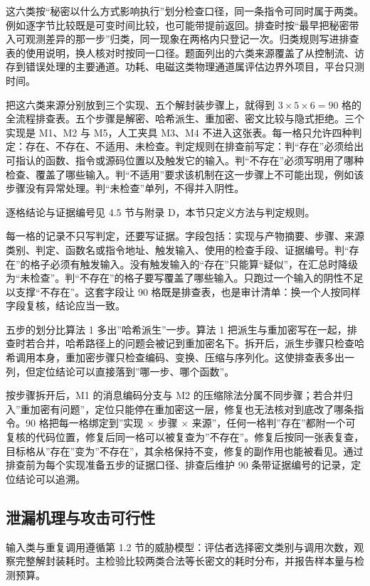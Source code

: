 这六类按“秘密以什么方式影响执行”划分检查口径，同一条指令可同时属于两类。例如逐字节比较既是可变时间比较，也可能带提前返回。排查时按“最早把秘密带入可观测差异的那一步”归类，同一现象在两格内只登记一次。归类规则写进排查表的使用说明，换人核对时按同一口径。题面列出的六类来源覆盖了从控制流、访存到错误处理的主要通道。功耗、电磁这类物理通道属评估边界外项目，平台只测时间。

把这六类来源分别放到三个实现、五个解封装步骤上，就得到 $3\times5\times6=90$ 格的全流程排查表。五个步骤是解密、哈希派生、重加密、密文比较与隐式拒绝。三个实现是 M1、M2 与 M5，人工夹具 M3、M4 不进入这张表。每一格只允许四种判定：存在、不存在、不适用、未检查。判定规则在排查前写定：判“存在”必须给出可指认的函数、指令或源码位置以及触发它的输入。判“不存在”必须写明用了哪种检查、覆盖了哪些输入。判“不适用”要求该机制在这一步骤上不可能出现，例如该步骤没有异常处理。判“未检查”单列，不得并入阴性。

逐格结论与证据编号见 4.5 节与附录 D，本节只定义方法与判定规则。

每一格的记录不只写判定，还要写证据。字段包括：实现与产物摘要、步骤、来源类别、判定、函数名或指令地址、触发输入、使用的检查手段、证据编号。判“存在”的格子必须有触发输入。没有触发输入的“存在”只能算“疑似”，在汇总时降级为“未检查”。判“不存在”的格子要写覆盖了哪些输入。只跑过一个输入的阴性不足以支撑“不存在”。这套字段让 90 格既是排查表，也是审计清单：换一个人按同样字段复核，结论应当一致。

五步的划分比算法 1 多出”哈希派生”一步。算法 1 把派生与重加密写在一起，排查时若合并，哈希路径上的问题会被记到重加密名下。拆开后，派生步骤只检查哈希调用本身，重加密步骤只检查编码、变换、压缩与序列化。这使排查表多出一列，但定位结论可以直接落到”哪一步、哪个函数”。

按步骤拆开后，M1 的消息编码分支与 M2 的压缩除法分属不同步骤；若合并归入”重加密有问题”，定位只能停在重加密这一层，修复也无法核对到底改了哪条指令。90 格把每一格绑定到”实现 × 步骤 × 来源”，任何一格判”存在”都附一个可复核的代码位置，修复后同一格可以被复查为”不存在”。修复后按同一张表复查，目标格从”存在”变为”不存在”，其余格保持不变，修复的副作用也能被看见。通过排查前为每个实现准备五步的证据口径、排查后维护 90 条带证据编号的记录，定位结论可以追溯。

\subsection{泄漏机理与攻击可行性}

输入类与重复调用遵循第 1.2 节的威胁模型：评估者选择密文类别与调用次数，观察完整解封装耗时。主检验比较两类合法等长密文的耗时分布，并报告样本量与检测预算。

